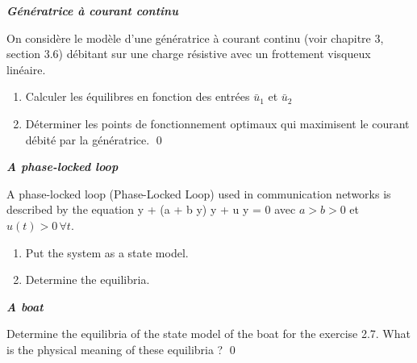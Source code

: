\begin{exercice}{\bf \em G\'en\'eratrice \`a courant continu}

On consid\`ere le mod\`ele d'une g\'en\'eratrice \`a courant continu (voir chapitre 3, section 3.6) d\'ebitant sur une charge r\'esistive avec un frottement visqueux lin\'eaire.
\begin{enumerate}
\item Calculer les \'equilibres en fonction des entr\'ees $\bar u_1$ et $\bar u_2$
\item D\'eterminer les points de fonctionnement optimaux qui maximisent le courant d\'ebit\'e par la g\'en\'eratrice. \qed
\end{enumerate}
\end{exercice}
\vv

\begin{exercice}{\bf \em A phase-locked loop}

A phase-locked loop (Phase-Locked Loop) used in communication networks is described by the equation
\eqnn
\ddot y + (a + b \cos y) \dot y + u \sin y = 0
\eeqnn
avec $a > b > 0$ et $u(t) > 0 \, \forall t$. 
\begin{enumerate}
\item Put the system as a state model.
\item Determine the equilibria.
\end{enumerate}
\end{exercice}
\vv

\begin{exercice}{\bf \em A boat}

Determine the equilibria of the state model of the boat for the exercise 2.7. What is the physical meaning of these equilibria ? \qed
\end{exercice}
\vv 

